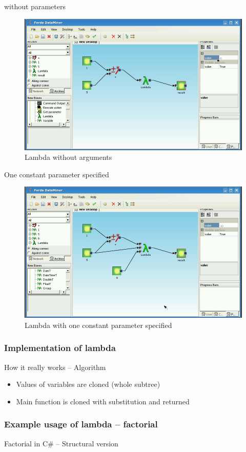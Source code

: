 \documentclass[a4paper,12pt]{book}
\begin{document}
without parameters
\begin{figure}
\includegraphics[width=12cm]{lambdaBasic2.png}
	\caption{Lambda without arguments}
\end{figure}

One constant parameter specified
\begin{figure}
\includegraphics[width=12cm]{lambdaBasic3.png}
	\caption{Lambda with one constant parameter specified}
\end{figure}
	
\subsubsection{Implementation of lambda}
How it really works -- Algorithm
\begin{itemize}
	\item Values of variables are cloned (whole subtree)
	\item Main function is cloned with substitution and returned
\end{itemize}

\subsubsection{Example usage of lambda -- factorial}
Factorial in C\# -- Structural version
\end{document}
